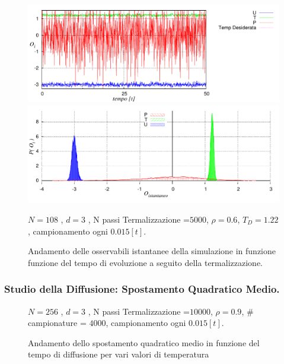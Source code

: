 \documentclass[11pt]{article}
\theoremstyle{plain}
\theoremstyle{remark}
\begin{document}
	
	\begin{figure}
		\centering
		\caption[Sfere Soffici$/$Problema10.cpp]{Andamento delle osservabili istantanee della simulazione in funzione funzione del tempo di evoluzione a seguito della termalizzazione.}\label{fig: Problema10}
		\includegraphics[scale=0.5]{Immagini/Soffici/OvsStep}

		\includegraphics[scale=0.5]{Immagini/Soffici/IstoO}


		\centering  \footnotesize{$N= 108$ , $d=3$ , N passi Termalizzazione =$ 5000$, $\rho = 0.6$,	$T_D=1.22$, campionamento ogni $0.015 [t]$.}
	\end{figure}




\subsubsection{Studio della Diffusione: Spostamento Quadratico Medio.}
	\begin{figure}
		\centering
		\caption[Sfere Soffici$/$Problema11.cpp]{Andamento dello spostamento quadratico medio in funzione del tempo di diffusione per vari valori di temperatura}\label{fig: Problema11}


		\centering  \footnotesize{$N= 256$ , $d=3$ , N passi Termalizzazione =$ 10000$, $\rho = 0.9$, # campionature = $ 4000$, campionamento ogni $0.015 [t]$.}
	\end{figure}
\end{document}
